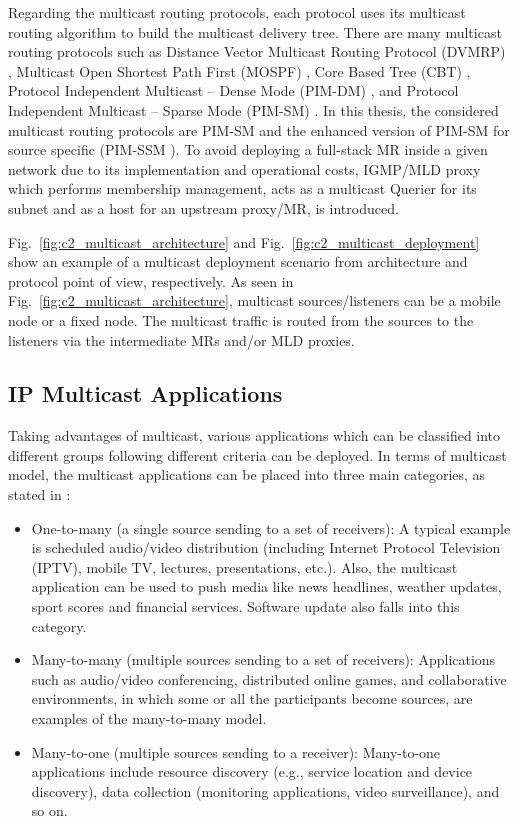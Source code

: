 Regarding the multicast routing protocols, each protocol uses its multicast routing algorithm to build the multicast delivery tree. There are many multicast routing protocols such as Distance Vector Multicast Routing Protocol (DVMRP) \cite{DVMRP}, Multicast Open Shortest Path First (MOSPF) \cite{MOSPF}, Core Based Tree (CBT) \cite{CBT,CBTv2}, Protocol Independent Multicast – Dense Mode (PIM-DM) \cite{PIM_DM}, and Protocol Independent Multicast – Sparse Mode (PIM-SM) \cite{PIM_SM}. 
In this thesis, the considered multicast routing protocols are PIM-SM and the enhanced version of PIM-SM for source specific (PIM-SSM \cite{PIM_SM}). To avoid deploying a full-stack MR inside a given network due to its implementation and operational costs, IGMP/MLD proxy \cite{MLD_proxy} which performs membership management, acts as a multicast Querier for its subnet and as a host for an upstream proxy/MR, is introduced. 

Fig.~\ref{fig:c2_multicast_architecture} and Fig.~\ref{fig:c2_multicast_deployment} show an example of a multicast deployment scenario from architecture and protocol point of view, respectively. As seen in Fig.~\ref{fig:c2_multicast_architecture}, multicast sources/listeners can be a mobile node or a fixed node. The multicast traffic is routed from the sources to the listeners via the intermediate MRs and/or MLD proxies. 

\subsection{IP Multicast Applications}
Taking advantages of multicast, various applications which can be classified into different groups following different criteria can be deployed. In terms of multicast model, the multicast applications can be placed into three main categories, as stated in \cite{multicast_applications,multimedia_multicast}:
\begin{itemize}
\item One-to-many (a single source sending to a set of receivers):  A typical example is scheduled audio/video distribution (including Internet Protocol Television (IPTV), mobile TV, lectures, presentations, etc.). Also, the multicast application can be used to push media like news headlines, weather updates, sport scores and financial services. Software update also falls into this category. 
\item Many-to-many (multiple sources sending to a set of receivers): Applications such as audio/video conferencing, distributed online games, and collaborative environments, in which some or all the participants become sources, are examples of the many-to-many model. 
\item Many-to-one (multiple sources sending to a receiver): Many-to-one applications include resource discovery (e.g., service location and device discovery), data collection (monitoring applications, video surveillance), and so on.  
\end{itemize}

